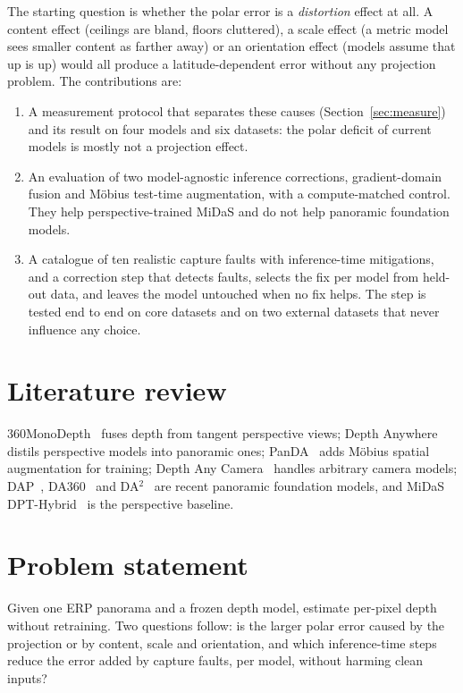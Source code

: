 \documentclass{article}
\begin{document}
The starting question is whether the polar error is a \emph{distortion} effect at all. A content effect (ceilings are bland, floors cluttered), a scale effect (a metric model sees smaller content as farther away) or an orientation effect (models assume that up is up) would all produce a latitude-dependent error without any projection problem. The contributions are:
\begin{enumerate}
\item A measurement protocol that separates these causes (Section~\ref{sec:measure}) and its result on four models and six datasets: the polar deficit of current models is mostly not a projection effect.
\item An evaluation of two model-agnostic inference corrections, gradient-domain fusion and M\"obius test-time augmentation, with a compute-matched control. They help perspective-trained MiDaS and do not help panoramic foundation models.
\item A catalogue of ten realistic capture faults with inference-time mitigations, and a correction step that detects faults, selects the fix per model from held-out data, and leaves the model untouched when no fix helps. The step is tested end to end on core datasets and on two external datasets that never influence any choice.
\end{enumerate}

\section{Literature review}
360MonoDepth~\cite{rey2022360monodepth} fuses depth from tangent perspective views; Depth Anywhere~\cite{wang2024depthanywhere} distils perspective models into panoramic ones; PanDA~\cite{zhu2024panda} adds M\"obius spatial augmentation for training; Depth Any Camera~\cite{guo2025dac} handles arbitrary camera models; DAP~\cite{lin2025dap}, DA360~\cite{jiang2025da360} and DA$^2$~\cite{li2026da2} are recent panoramic foundation models, and MiDaS DPT-Hybrid~\cite{ranftl2021dpt} is the perspective baseline.

\section{Problem statement}\label{sec:problem}
Given one ERP panorama and a frozen depth model, estimate per-pixel depth without retraining. Two questions follow: is the larger polar error caused by the projection or by content, scale and orientation, and which inference-time steps reduce the error added by capture faults, per model, without harming clean inputs?
\end{document}
